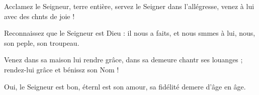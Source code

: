 \item Acclamez le Seigneur, terre entière,\pscross{} servez le Seigner dans l’allégresse,\psstar{} venez à lui avec des chnts de joie !
\item Reconnaissez que le Seigneur est Dieu :\pscross{} il nous a faits, et nous smmes à lui,\psstar{} nous, son peple, son troupeau.
\item Venez dans sa maison lui rendre grâce,\pscross{} dans sa demeure chantr ses louanges ;\psstar{} rendez-lui grâce et bénissz son Nom !
\item Oui, le Seigneur est bon,\pscross{} éternl est son amour,\psstar{} sa fidélité demere d’âge en âge.